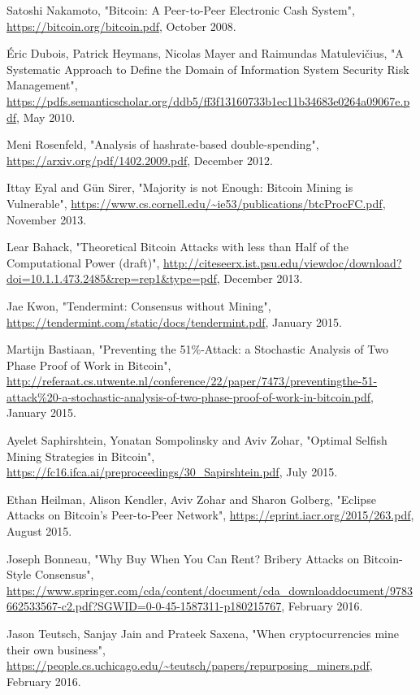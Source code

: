 \documentclass[11pt,a4paper]{article}
\begin{document}
\newpage
\begin{thebibliography}{9}

Satoshi Nakamoto,
"Bitcoin: A Peer-to-Peer Electronic Cash System",
\url{https://bitcoin.org/bitcoin.pdf},
October 2008.

Éric Dubois, Patrick Heymans, Nicolas Mayer and Raimundas Matulevičius,
"A Systematic Approach to Define the Domain of Information System Security Risk Management",
\url{https://pdfs.semanticscholar.org/ddb5/ff3f13160733b1ec11b34683e0264a09067e.pdf},
May 2010.

Meni Rosenfeld,
"Analysis of hashrate-based double-spending",
\url{https://arxiv.org/pdf/1402.2009.pdf},
December 2012.

Ittay Eyal and Gün Sirer,
"Majority is not Enough: Bitcoin Mining is Vulnerable",
\url{https://www.cs.cornell.edu/~ie53/publications/btcProcFC.pdf},
November 2013.

Lear Bahack,
"Theoretical Bitcoin Attacks with less than Half of the Computational Power (draft)",
\url{http://citeseerx.ist.psu.edu/viewdoc/download?doi=10.1.1.473.2485&rep=rep1&type=pdf},
December 2013.

Jae Kwon,
"Tendermint: Consensus without Mining",
\url{https://tendermint.com/static/docs/tendermint.pdf},
January 2015.

Martijn Bastiaan,
"Preventing the 51\%-Attack: a Stochastic Analysis of Two Phase Proof of Work in Bitcoin",
\url{http://referaat.cs.utwente.nl/conference/22/paper/7473/preventingthe-51-attack%20-a-stochastic-analysis-of-two-phase-proof-of-work-in-bitcoin.pdf},
January 2015.

Ayelet Saphirshtein, Yonatan Sompolinsky and Aviv Zohar,
"Optimal Selfish Mining Strategies in Bitcoin",
\url{https://fc16.ifca.ai/preproceedings/30_Sapirshtein.pdf},
July 2015.

Ethan Heilman, Alison Kendler, Aviv Zohar and Sharon Golberg,
"Eclipse Attacks on Bitcoin’s Peer-to-Peer Network",
\url{https://eprint.iacr.org/2015/263.pdf},
August 2015.

Joseph Bonneau,
"Why Buy When You Can Rent? Bribery Attacks on Bitcoin-Style Consensus",
\url{https://www.springer.com/cda/content/document/cda_downloaddocument/9783662533567-c2.pdf?SGWID=0-0-45-1587311-p180215767},
February 2016.

Jason Teutsch, Sanjay Jain and Prateek Saxena,
"When cryptocurrencies mine their own business",
\url{https://people.cs.uchicago.edu/~teutsch/papers/repurposing_miners.pdf},
February 2016.


\end{thebibliography}
\end{document}

